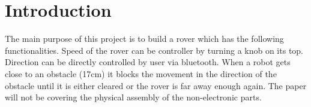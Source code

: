 \section{Introduction}

The main purpose of this project is to build a rover which has the following functionalities. Speed of the rover can be controller by turning a knob on its top. Direction can be directly controlled by user via bluetooth. When a robot gets close to an obstacle (17cm) it blocks the movement in the direction of the obstacle until it is either cleared or the rover is far away enough again. The paper will not be covering the physical assembly of the non-electronic parts.